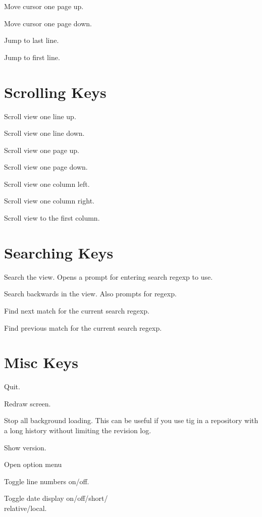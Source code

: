  {Move cursor one page up.}

 {Move cursor one page down.}

 {Jump to last line.}

 {Jump to first line.}


\vskip 2.5cm
\section{Scrolling Keys}
 {Scroll view one line up.}

 {Scroll view one line down.}

 {Scroll view one page up.}

 {Scroll view one page down.}

 {Scroll view one column left.}

 {Scroll view one column right.}

\cmdS{|} {Scroll view to the first column.}


\section{Searching Keys}
\cmdS{/} {Search the view. Opens a prompt for entering
             search regexp to use.}

 {Search backwards in the view. Also prompts for regexp.}

 {Find next match for the current search regexp.}

 {Find previous match for the current search regexp.}

\section{Misc Keys}
 {Quit.}

 {Redraw screen.}

 {Stop all background loading. This can be useful if you use tig in a
repository with a long history without limiting the revision log.}

 {Show version.}

 {Open option menu}

 {Toggle line numbers on/off.}

 {Toggle date display on/off/short/\\relative/local.}

